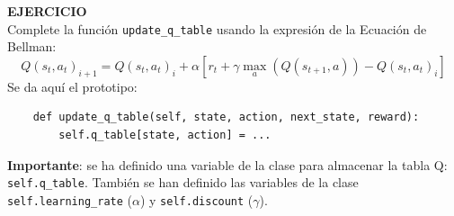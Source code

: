 \documentclass{article}
\begin{document}





\begin{exercise}[breakable]
\textbf{EJERCICIO}\\
    Complete la función \texttt{update\_q\_table} usando la expresión de la Ecuación de Bellman:
    \begin{equation}
Q(s_t,a_t)_{i+1} = Q(s_t,a_t)_{i} + \alpha [r_t + \gamma 
\max_a(Q(s_{t+1},a))- Q(s_t,a_t)_{i}]  
\end{equation}
Se da aquí el prototipo:
    \begin{verbatim}
    def update_q_table(self, state, action, next_state, reward):
        self.q_table[state, action] = ...
    \end{verbatim}
    \textbf{Importante}: se ha definido una variable de la clase para almacenar la tabla Q: \texttt{self.q\_table}. También se han definido las variables de la clase \texttt{self.learning\_rate} ($\alpha$) y \texttt{self.discount} ($\gamma$).
\end{exercise}
\end{document}
